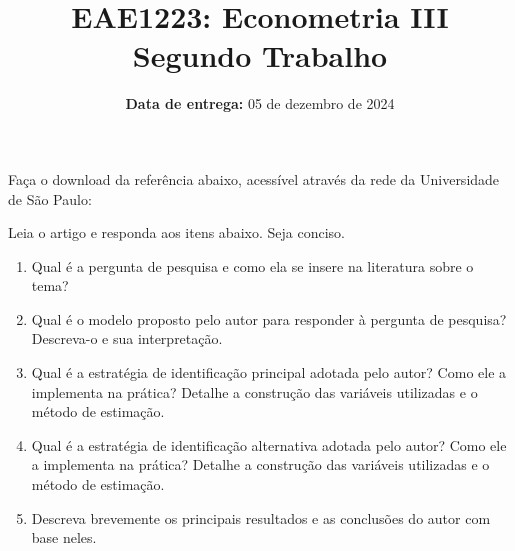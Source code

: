 \documentclass[12pt,a4paper]{article}
\title{ \large EAE1223: Econometria III \\
	{\large Segundo Trabalho}}
\date{\small \textbf{Data de entrega:} 05 de dezembro de 2024}
\begin{document}
	\maketitle
Faça o download da referência abaixo, acessível através da rede da Universidade de São Paulo:

\vspace{1em}
\noindent{}
\vspace{1em}

Leia o artigo e responda aos itens abaixo. Seja conciso.

\begin{enumerate}
	\item Qual é a pergunta de pesquisa e como ela se insere na literatura sobre o tema?
	\item Qual é o modelo proposto pelo autor para responder à pergunta de pesquisa? Descreva-o e sua interpretação.
	
	\item Qual é a estratégia de identificação principal adotada pelo autor? Como ele a implementa na prática? Detalhe a construção das variáveis utilizadas e o método de estimação.
	
	\item  Qual é a estratégia de identificação alternativa adotada pelo autor? Como ele a implementa na prática? Detalhe a construção das variáveis utilizadas e o método de estimação.
	
	\item Descreva brevemente os principais resultados e as conclusões do autor com base neles.
\end{enumerate} 
\end{document}
